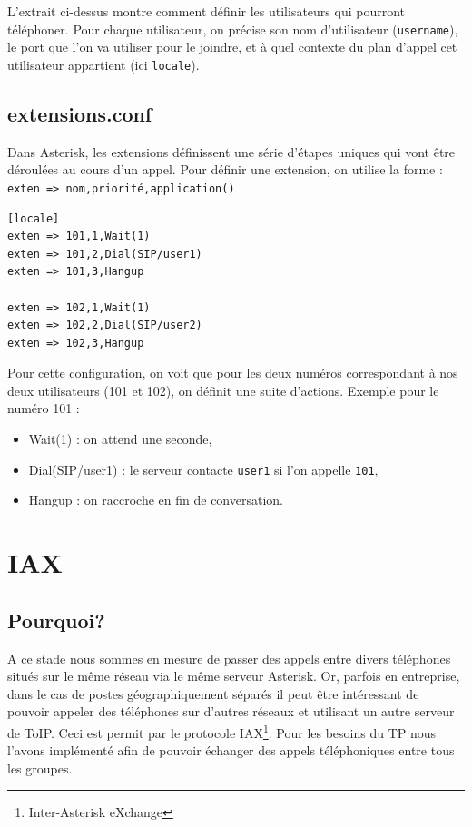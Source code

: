 \documentclass[12pt,a4paper,notitlepage]{article}
\begin{document}
L'extrait ci-dessus montre comment définir les utilisateurs qui pourront téléphoner. Pour chaque utilisateur, on précise son nom d'utilisateur (\texttt{username}), le port que l'on va utiliser pour le joindre, et à quel contexte du plan d'appel cet utilisateur appartient (ici \texttt{locale}). 


\subsection{extensions.conf}

Dans Asterisk, les extensions définissent une série d'étapes uniques qui vont être déroulées au cours d'un appel. Pour définir une extension, on utilise la forme : \\

\noindent \texttt{exten => nom,priorité,application()}\\

\begin{lstlisting}[title=Extensions.conf v1]
[locale]
exten => 101,1,Wait(1)
exten => 101,2,Dial(SIP/user1)
exten => 101,3,Hangup

exten => 102,1,Wait(1)
exten => 102,2,Dial(SIP/user2)
exten => 102,3,Hangup
\end{lstlisting}

\clearpage
Pour cette configuration, on voit que pour les deux numéros correspondant à nos deux utilisateurs (101 et 102), on définit une suite d'actions. Exemple pour le numéro 101 :\bigskip

\begin{itemize}
\item Wait(1) : on attend une seconde,
\item Dial(SIP/user1) : le serveur contacte \texttt{user1} si l'on appelle \texttt{101},
\item Hangup : on raccroche en fin de conversation.
\end{itemize}

\section{IAX} 
\subsection{Pourquoi?}
A ce stade nous sommes en mesure de passer des appels entre divers téléphones situés sur le même réseau via le même serveur Asterisk. Or, parfois en entreprise, dans le cas de postes géographiquement séparés il peut être intéressant de pouvoir appeler des téléphones sur d'autres réseaux et utilisant un autre serveur de ToIP. Ceci est permit par le protocole IAX\footnote{Inter-Asterisk eXchange}. Pour les besoins du TP nous l'avons implémenté afin de pouvoir échanger des appels téléphoniques entre tous les groupes.
\end{document}
